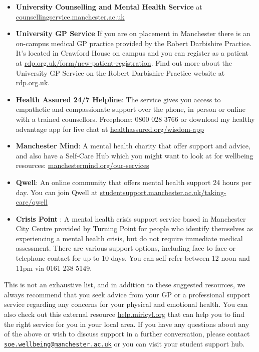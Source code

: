 \documentclass[
]{book}
\providecommand{\tightlist}{%
  \setlength{\itemsep}{0pt}\setlength{\parskip}{0pt}}
\begin{document}
\begin{itemize}
\tightlist
\item
  \textbf{University Counselling and Mental Health Service} at \href{https://www.counsellingservice.manchester.ac.uk/}{counsellingservice.manchester.ac.uk} \citep{counselling}
\item
  \textbf{University GP Service} If you are on placement in Manchester there is an on-campus medical GP practice provided by the Robert Darbishire Practice. It's located in Crawford House on campus and you can register as a patient at \href{https://rdp.org.uk/form/new-patient-registration/}{rdp.org.uk/form/new-patient-registration}. Find out more about the University GP Service on the Robert Darbishire Practice website at \href{https://rdp.org.uk}{rdp.org.uk}.\citep{darbishire}
\item
  \textbf{Health Assured 24/7 Helpline}: The service gives you access to empathetic and compassionate support over the phone, in person or online with a trained counsellors. Freephone: 0800 028 3766 or download my healthy advantage app for live chat at \href{https://www.healthassured.org/wisdom-app/}{healthassured.org/wisdom-app}
\item
  \textbf{Manchester Mind}: A mental health charity that offer support and advice, and also have a Self-Care Hub which you might want to look at for wellbeing resources: \href{https://www.manchestermind.org/our-services/}{manchestermind.org/our-services} \citep{manchestermind}
\item
  \textbf{Qwell}: An online community that offers mental health support 24 hours per day. You can join Qwell
  at \href{https://www.studentsupport.manchester.ac.uk/taking-care/qwell/}{studentsupport.manchester.ac.uk/taking-care/qwell} \citep{qwell}
\item
  \textbf{Crisis Point} : A mental health crisis support service based in Manchester City Centre provided by Turning Point for people who identify themselves as experiencing a mental health crisis, but do not require immediate medical assessment. There are various support options, including face to face or telephone contact for up to 10 days. You can self-refer between 12 noon and 11pm via 0161 238 5149.
\end{itemize}

This is not an exhaustive list, and in addition to these suggested resources, we always recommend that you seek advice from your GP or a professional support service regarding any concerns for your physical and emotional health. You can also check out this external resource \href{https://help.miricyl.org}{help.miricyl.org} that can help you to find the right service for you in your local area. If you have any questions about any of the above or wish to discuss support in a further conversation, please
contact \href{mailto:soe.wellbeing@manchester.ac.uk}{\nolinkurl{soe.wellbeing@manchester.ac.uk}} or you can visit your student support hub.
\end{document}
